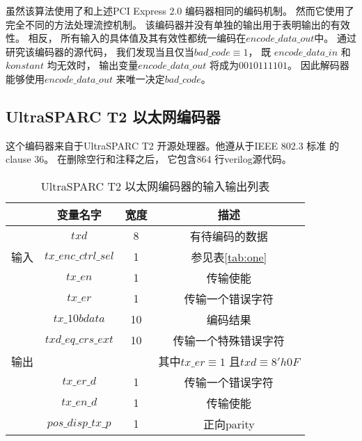 虽然该算法使用了和上述PCI Express 2.0 编码器相同的编码机制。
然而它使用了完全不同的方法处理流控机制。
该编码器并没有单独的输出用于表明输出的有效性。
相反，
所有输入的具体值及其有效性都统一编码在$encode\_data\_out$中。
通过研究该编码器的源代码，
我们发现当且仅当$bad\_code\equiv 1$，
既
$encode\_data\_in$ 和$konstant$ 均无效时，
输出变量$encode\_data\_out$ 将成为$0010111101$。
因此解码器能够使用$encode\_data\_out$ 来唯一决定$bad\_code$。



\subsection{UltraSPARC T2 以太网编码器}\label{subsec_t2e}
这个编码器来自于UltraSPARC T2 开源处理器。他遵从于IEEE 802.3 标准 的clause 36。
在删除空行和注释之后，
它包含864 行verilog源代码。


\begin{table}[b]%
\caption{UltraSPARC T2 以太网编码器的输入输出列表}
\label{tab:t2eth}
\centering
\begin{tabular}{|c|c|c|c|}
\hline
         & 变量名字             & 宽度  & 描述\\\hline\hline
         & $txd$                & 8     &有待编码的数据\\\cline{2-4}
输入     & $tx\_enc\_ctrl\_sel$ & 1     &参见表\ref{tab:one} \\\cline{2-4}
         & $tx\_en$             & 1     &传输使能\\\cline{2-4}
         & $tx\_er$             & 1     &传输一个错误字符\\\hline
         & $tx\_10bdata$        & 10    &编码结果 \\\cline{2-4}
         & $txd\_eq\_crs\_ext$  & 10    &传输一个特殊错误字符\\
输出     &                      &       &其中$tx\_er\equiv 1$ 且$txd\equiv 8'h0F$ \\\cline{2-4}
         & $tx\_er\_d$          & 1     &传输一个错误字符\\\cline{2-4}
         & $tx\_en\_d$          & 1     &传输使能\\\cline{2-4}
         & $pos\_disp\_tx\_p$   & 1     &正向parity\\\hline
\end{tabular}
\end{table}%

